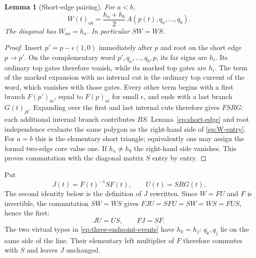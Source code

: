 \documentclass[11pt,letterpaper]{article}
\numberwithin{equation}{section}
\newtheorem{lemma}[theorem]{Lemma}
\theoremstyle{definition}
\theoremstyle{remark}
\begin{document}
\begin{lemma}[Short-edge pairing]
\label{ep:wronskian}
For $a<b$,
\begin{equation}
 W(t)_{ab}=\frac{h_a+h_b}{2}\,A(p(t),q_a,\ldots,q_b).
 \label{ep:W-entry}
\end{equation}
The diagonal has $W_{aa}=h_a$.  In particular $SW=WS$.
\end{lemma}
\begin{proof}
Insert $p'=p-\epsilon(1,0)$ immediately after $p$ and root on the short
edge $p\to p'$.  On the complementary word
$p',q_a,\ldots,q_b,p$, its far signs are $h_i$.  Its ordinary top
gates therefore vanish, while its marked top gates are $h_i$.  The term
of the marked expansion with no internal cut is the ordinary top current
of the word, which vanishes with those gates.  Every other term begins
with a first branch $F(p')_{ai}$, equal to $F(p)_{ai}$ for small
$\epsilon$, and ends with a last branch $G(t)_{jb}$.  Expanding
over the first and last internal cuts therefore gives $F S R G$:
each additional internal branch contributes $BS$.  Lemma~\ref{ep:short-edge}
and root independence evaluate the same polygon as the right-hand side
of \eqref{ep:W-entry}.  For $a=b$ this is the elementary short triangle;
equivalently one may assign the formal two-edge core value one.
If $h_a\ne h_b$ the right-hand side vanishes.  This proves commutation
with the diagonal matrix $S$ entry by entry.
\end{proof}

Put
\begin{equation}
 J(t)=F(t)^{-1}SF(t),\qquad U(t)=SRG(t).
 \label{ep:J-U}
\end{equation}
The second identity below is the definition of $J$ rewritten. Since
$W=FU$ and $F$ is invertible, the commutation $SW=WS$ gives
$FJU=SFU=SW=WS=FUS$, hence the first:
\begin{equation}
 J U=U S,\qquad F J=S F.
 \label{ep:intertwining}
\end{equation}
The two virtual types in \eqref{ep:three-endpoint-events} have $h_k=h_j$:
$q_k,q_j$ lie on the same side of the line.  Their elementary left
multiplier of $F$ therefore commutes with $S$ and leaves $J$ unchanged.
\end{document}
